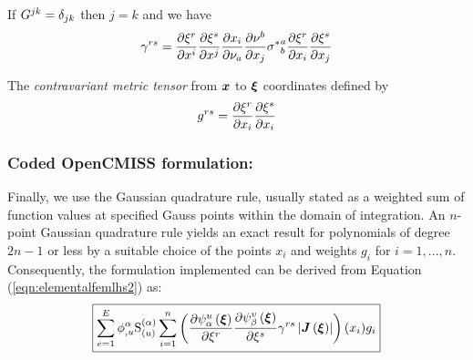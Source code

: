 If $G^{jk}=\delta_{{j}{k}}$ then $j=k$ and we have
\begin{equation}
  \gamma^{rs}= \dfrac{\partial \xi^{r}}{\partial x^{i}}  \dfrac{\partial \xi^{s}}{\partial x^{j}}  \dfrac{\partial x_{i}}{\partial \nu_{a}}  \dfrac{\partial \nu^{b}}{\partial x_{j}} {\sigma^{*}}^{a}_{b} \dfrac{\partial \xi^{r}}{\partial x_{i}}  \dfrac{\partial \xi^{s}}{\partial x_{j}} 
\end{equation}



The \emph{contravariant metric tensor} from $\vect{x}$ to $\vect{\xi}$ coordinates defined by
\begin{equation}
  g^{rs}= \dfrac{\partial \xi^{r}}{\partial x_{i}}  \dfrac{\partial \xi^{s}}{\partial x_{i}} 
  \label{eqn:contrametrictensor}
\end{equation}

\subsubsection{Coded OpenCMISS formulation:}
Finally, we use the Gaussian quadrature rule, usually stated as a weighted sum of function values at specified Gauss points within the domain of integration. An $n$-point Gaussian quadrature rule yields an exact result for polynomials of degree $2n-1$ or less by a suitable choice of the points $x_i$ and weights $g_i$ for $i = 1,...,n$. Consequently, the formulation implemented can be derived from Equation (\ref{eqn:elementalfemlhs2}) as: 
\begin{equation}
  \boxed{
  \dsum_{e=1}^{E}\nodedof{\phi}{\alpha}{u}\gsf{(\alpha)}{(u)}
  \dsum_{i=1}^{n}
  \left(\delby{\gbfn{\alpha}{u}{\vect{\xi}}}{\xi^{r}}
  \delby{\gbfn{\beta}{v}{\vect{\xi}}}{\xi^{s}}\gamma^{rs}\abs{\fnof{\matr{J}}{\vect{\xi}}}
  \right)(x_i)g_i
  }
\end{equation}
